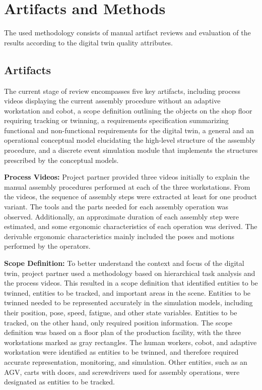 \documentclass{llncs}
\begin{document}
    \section{Artifacts and Methods}
    The used methodology consists of manual artifact reviews and evaluation of the results according to the digital twin quality attributes.    
    \subsection{Artifacts}
    The current stage of review encompasses five key artifacts, including process videos displaying the current assembly procedure without an adaptive workstation and cobot, a scope definition outlining the objects on the shop floor requiring tracking or twinning, a requirements specification summarizing functional and non-functional requirements for the digital twin, a general and an operational conceptual model elucidating the high-level structure of the assembly procedure, 
    and a discrete event simulation module that implements the structures prescribed by the conceptual models.

    \textbf{Process Videos:}
    Project partner provided three videos initially to explain the manual assembly procedures performed at each of the three workstations. From the videos,  
    the sequence of assembly steps were extracted  at least for one product variant. The tools and the parts needed for each assembly operation was observed. Additionally, an approximate duration of each assembly step were estimated, and some ergonomic characteristics of each operation was derived. 
    The derivable ergonomic characteristics mainly included the poses and motions performed by the operators.

    \textbf{Scope Definition:}
    To better understand the context and focus of the digital twin, 
    project partner used a methodology based on hierarchical task analysis and the process videos. 
    This resulted in a scope definition that identified entities to be twinned, entities to be tracked, and important areas in the scene. 
    Entities to be twinned needed to be represented accurately in the simulation models, including their position, pose, speed, fatigue, and other state variables. 
    Entities to be tracked, on the other hand, only required position information. The scope definition was based on a floor plan of the production facility, with the three workstations marked as gray rectangles. 
    The human workers, cobot, and adaptive workstation were identified as entities to be twinned, and therefore required accurate representation, 
    monitoring, and simulation. Other entities, such as an AGV, carts with doors, and screwdrivers used for assembly operations, were designated as entities to be tracked.
\end{document}
